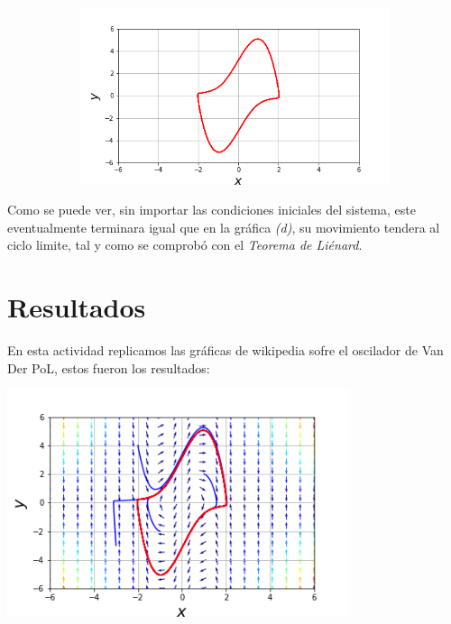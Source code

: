 \documentclass{article}
\begin{document}
\begin{figure}[h!]
\begin{subfigure}[b]{0.45\linewidth}
    \caption{}
  \end{subfigure}
  \begin{subfigure}[b]{0.45\linewidth}
    \includegraphics[width=\linewidth]{EspacioFase.png}
    \caption{}
  \end{subfigure}
\end{figure}

\vspace{0.3cm}

Como se puede ver, sin importar las condiciones iniciales del sistema, este eventualmente terminara igual que en la gráfica \textit{(d)}, su movimiento tendera al ciclo limite, tal y como se comprobó con el \textit{Teorema de Liénard}. 
 
\section{Resultados}

En esta actividad replicamos las gráficas  de wikipedia sofre el oscilador de Van Der PoL, estos fueron los resultados:

\begin{center}
	\includegraphics[width=10cm]{PrimeraFig.png}
    
\end{center}
\vspace{0.3cm}
\end{document}
